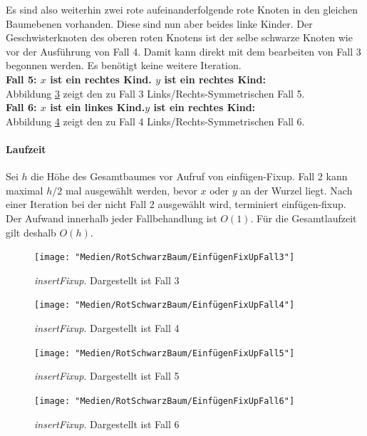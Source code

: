\documentclass[a4paper,12pt]{article}
\begin{document}
\noindent Es sind also weiterhin zwei rote aufeinanderfolgende rote Knoten in den gleichen Baumebenen vorhanden. Diese sind nun aber beides linke Kinder. Der Geschwisterknoten des oberen roten Knotens ist der selbe schwarze Knoten wie vor der Ausführung von Fall 4. Damit kann direkt mit dem bearbeiten von Fall 3 begonnen werden. Es benötigt keine weitere Iteration.\\

\noindent\textbf{Fall 5: $x$ ist ein rechtes Kind. $y$ ist ein rechtes Kind: }\\ 
Abbildung \ref{fig:EinfügenFixUpFall5} zeigt den zu Fall 3 Links/Rechts-Symmetrischen Fall 5.\\
\noindent\textbf{Fall 6:  $x$ ist ein linkes Kind.$y$ ist ein rechtes Kind: }\\ 
Abbildung \ref{fig:EinfügenFixUpFall6} zeigt den zu Fall 4 Links/Rechts-Symmetrischen Fall 6.\\


\paragraph{Laufzeit}
\noindent  Sei $h$ die Höhe des Gesamtbaumes vor Aufruf von einfügen-Fixup. Fall 2 kann maximal $h / 2$ mal ausgewählt werden, bevor $x$ oder $y$ an der Wurzel liegt. Nach einer Iteration bei der nicht Fall 2 ausgewählt wird, terminiert einfügen-fixup. Der Aufwand innerhalb jeder Fallbehandlung ist $O(1)$. Für die Gesamtlaufzeit gilt deshalb $\mathit{O(h)}$.
\begin{figure}[H]
	\centering
	\texttt{[image: "Medien/RotSchwarzBaum/EinfügenFixUpFall3"]}
	\caption{\textit{insertFixup}. Dargestellt ist Fall 3  }
	\label{fig:EinfügenFixUpFall3}
\end{figure}

\begin{figure}[h]
	\centering
	\texttt{[image: "Medien/RotSchwarzBaum/EinfügenFixUpFall4"]}
	\caption{\textit{insertFixup}. Dargestellt ist Fall 4  }
	\label{fig:EinfügenFixUpFall4}
\end{figure}

\begin{figure}[H]
	\centering
	\texttt{[image: "Medien/RotSchwarzBaum/EinfügenFixUpFall5"]}
	\caption{\textit{insertFixup}. Dargestellt ist Fall 5  }
	\label{fig:EinfügenFixUpFall5}
\end{figure}
\begin{figure}[H]
	\centering
	\texttt{[image: "Medien/RotSchwarzBaum/EinfügenFixUpFall6"]}
	\caption{\textit{insertFixup}. Dargestellt ist Fall 6  }
	\label{fig:EinfügenFixUpFall6}
\end{figure}   
\end{document}
